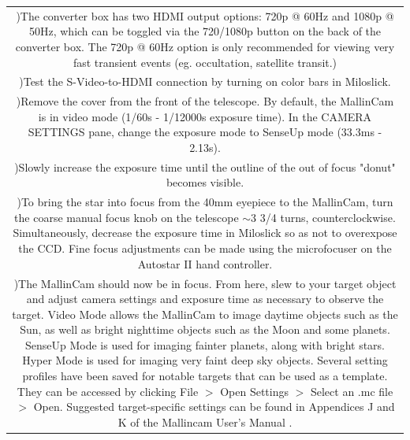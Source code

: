 \documentclass[12pt,titlepage]{article}
\newcounter{rowcount}
\newcommand{\step}{\stepcounter{rowcount}\therowcount)\hspace*{\tabcolsep}}
\begin{document}
\begin{longtable}{c}    
    \multicolumn{1}{m{\textwidth}}{\step The converter box has two HDMI output options: 720p @ 60Hz and 1080p @ 50Hz, which can be toggled via the 720/1080p button on the back of the converter box. The 720p @ 60Hz option is only recommended for viewing very fast transient events (eg. occultation, satellite transit.)} \\[2em]
    
    \multicolumn{1}{m{\textwidth}}{\step Test the S-Video-to-HDMI connection by turning on color bars in Miloslick.} \\
    
    \multicolumn{1}{m{\textwidth}}{\step Remove the cover from the front of the telescope. By default, the MallinCam is in video mode (1/60s - 1/12000s exposure time). In the CAMERA SETTINGS pane, change the exposure mode to SenseUp mode (33.3ms - 2.13s).} \\
   
    \multicolumn{1}{m{\textwidth}}{\step Slowly increase the exposure time until the outline of the out of focus "donut" becomes visible.}\\
    
    \multicolumn{1}{m{\textwidth}}{\step To bring the star into focus from the 40mm eyepiece to the MallinCam, turn the coarse manual focus knob on the telescope $\sim$3 3/4 turns, counterclockwise. Simultaneously, decrease the exposure time in Miloslick so as not to overexpose the CCD. Fine focus adjustments can be made using the microfocuser on the Autostar II hand controller.}\\
    
   \multicolumn{1}{m{\textwidth}}{\step The MallinCam should now be in focus. From here, slew to your target object and adjust camera settings and exposure time as necessary to observe the target. Video Mode allows the MallinCam to image daytime objects such as the Sun, as well as bright nighttime objects such as the Moon and some planets. SenseUp Mode is used for imaging fainter planets, along with bright stars. Hyper Mode is used for imaging very faint deep sky objects. Several setting profiles have been saved for notable targets that can be used as a template. They can be accessed by clicking File $>$ Open Settings $>$ Select an .mc file $>$ Open. Suggested target-specific settings can be found in Appendices J and K of the Mallincam User's Manual \cite{mallincam}.}
\end{longtable}
\end{document}
